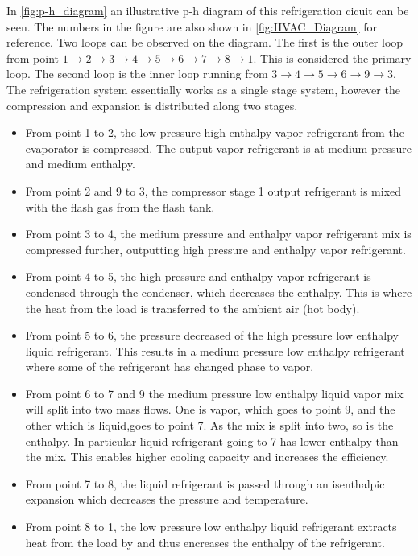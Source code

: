 In \cref{fig:p-h_diagram} an illustrative p-h diagram of this refrigeration cicuit can be seen. The numbers in the figure are also shown in \cref{fig:HVAC_Diagram} for reference. Two loops can be observed on the diagram. The first is the outer loop from point $1 \rightarrow 2\rightarrow 3 \rightarrow 4 \rightarrow 5 \rightarrow 6 \rightarrow 7 \rightarrow 8 \rightarrow 1$. This is considered the primary loop. The second loop is the inner loop running from $3 \rightarrow 4 \rightarrow 5 \rightarrow 6 \rightarrow 9 \rightarrow 3$. \\
The refrigeration system essentially works as a single stage system, however the compression and expansion is distributed along two stages.

\begin{itemize}
	\item From point 1 to 2, the low pressure high enthalpy vapor refrigerant from the evaporator is compressed. The output vapor refrigerant is at medium pressure and medium enthalpy. 
	\item From point 2 and 9 to 3, the compressor stage 1 output refrigerant is mixed with the flash gas from the flash tank. 
	\item From point 3 to 4, the medium pressure and enthalpy vapor refrigerant mix is compressed further, outputting high pressure and enthalpy vapor refrigerant.
	\item From point 4 to 5, the high pressure and enthalpy vapor refrigerant is condensed through the condenser, which decreases the enthalpy. This is where the heat from the load is transferred to the ambient air (hot body).
	\item From point 5 to 6, the pressure decreased of the high pressure low enthalpy liquid refrigerant. This results in a medium pressure low enthalpy refrigerant where some of the refrigerant has changed phase to vapor.
	\item From point 6 to 7 and 9 the medium pressure low enthalpy liquid vapor mix will split into two mass flows. One is vapor, which goes to point 9, and the other which is liquid,goes to point 7. As the mix is split into two, so is the enthalpy. In particular liquid refrigerant going to 7 has lower enthalpy than the mix. This enables higher cooling capacity and increases the efficiency.
	\item From point 7 to 8, the liquid refrigerant is passed through an isenthalpic expansion which decreases the pressure and temperature.
	\item From point 8 to 1, the low pressure low enthalpy liquid refrigerant extracts heat from the load by and thus encreases the enthalpy of the refrigerant.
\end{itemize}

